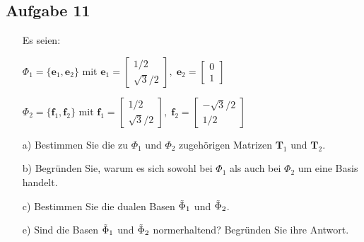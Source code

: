 \documentclass[11pt]{article}
\begin{document}
\vfill \null
\pagebreak

\subsection*{Aufgabe 11}
\begin{itemize}[leftmargin=0pt]
    \item[] Es seien:
    \item[] $\Phi_1 = \{\mathbf{e}_1, \mathbf{e}_2\}$ mit $\mathbf{e}_1 = \begin{bmatrix}
    1/2 \\ \sqrt{3}/2
\end{bmatrix}, \; \mathbf{e}_2 = \begin{bmatrix}
    0 \\ 1
\end{bmatrix}$
    \item[] $\Phi_2 = \{\mathbf{f}_1, \mathbf{f}_2\}$ mit $\mathbf{f}_1 = \begin{bmatrix}
    1/2 \\ \sqrt{3}/2
\end{bmatrix}, \; \mathbf{f}_2 = \begin{bmatrix}
    -\sqrt{3}/2 \\ 1/2
\end{bmatrix}$
\end{itemize}
\vspace*{-1cm}
\begin{itemize}
    \item[a)] Bestimmen Sie die zu $\Phi_1$ und $\Phi_2$ zugehörigen Matrizen $\mathbf{T}_1$ und $\mathbf{T}_2$. 
    \item[b)] Begründen Sie, warum es sich sowohl bei $\Phi_1$ als auch bei $\Phi_2$ um eine Basis handelt.
    \item[c)] Bestimmen Sie die dualen Basen $\Tilde{\Phi}_1$ und $\Tilde{\Phi}_2$.
    \item[e)] Sind die Basen $\Tilde{\Phi}_1$ und $\Tilde{\Phi}_2$ normerhaltend? Begründen Sie ihre Antwort.
\end{itemize}


\vfill \null
\pagebreak
\end{document}
